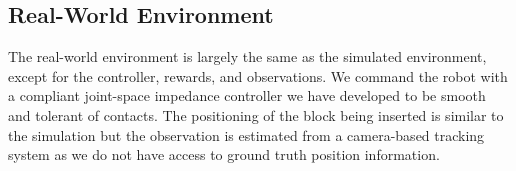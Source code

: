 \subsection{Real-World Environment}
The real-world environment is largely the same as the simulated environment, except for the controller, rewards, and observations.
We command the robot with a compliant joint-space impedance controller we have developed to be smooth and tolerant of contacts.
The positioning of the block being inserted is similar to the simulation but the observation is estimated from a camera-based tracking system as we do not have access to ground truth position information.

%


